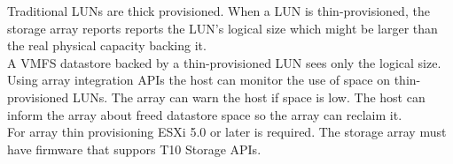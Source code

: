 Traditional LUNs are thick provisioned. When a LUN is thin-provisioned, the
storage array reports reports the LUN's logical size which might be larger
than the real physical capacity backing it.\\

A VMFS datastore backed by a thin-provisioned LUN sees only the logical
size.\\

Using array integration APIs the host can monitor the use of space on
thin-provisioned LUNs. The array can warn the host if space is low. The
host can inform the array about freed datastore space so the array can reclaim
it.\\

For array thin provisioning ESXi 5.0 or later is required. The storage array
must have firmware that suppors T10 Storage APIs.
